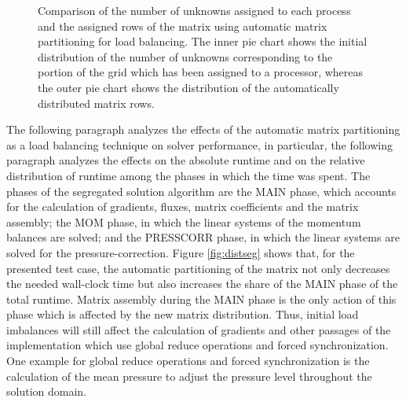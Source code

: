 \begin{figure}[h!]
\begin{minipage}{0.45\textwidth}
\end{minipage}
\caption{Comparison of the number of unknowns assigned to each process and the assigned rows of the matrix using automatic matrix partitioning for load balancing. The inner pie chart shows the initial distribution of the number of unknowns corresponding to the portion of the grid which has been assigned to a processor, whereas the outer pie chart shows the distribution of the automatically distributed matrix rows.}
\label{fig:matpart}
\end{figure}

The following paragraph analyzes the effects of the automatic matrix partitioning as a load balancing technique on solver performance, in particular, the following paragraph analyzes the effects on the absolute runtime and on the relative distribution of runtime among the phases in which the time was spent. The phases of the segregated solution algorithm are the MAIN phase, which accounts for the calculation of gradients, fluxes, matrix coefficients and the matrix assembly; the MOM phase, in which the linear systems of the momentum balances are solved; and the PRESSCORR phase, in which the linear systems are solved for the pressure-correction. Figure \ref{fig:distseg} shows that, for the presented test case, the automatic partitioning of the matrix not only decreases the needed wall-clock time but also increases the share of the MAIN phase of the total runtime. Matrix assembly during the MAIN phase is the only action of this phase which is affected by the new matrix distribution. Thus, initial load imbalances will still affect the calculation of gradients and other passages of the implementation which use global reduce operations and forced synchronization. One example for global reduce operations and forced synchronization is the calculation of the mean pressure to adjust the pressure level throughout the solution domain. 

